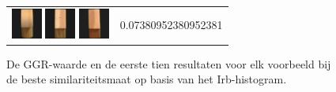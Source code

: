 \begin{figure}[tbp]
\begin{center}
\begin{tabular}{m{11cm} | m{3cm} |}
\includegraphics[width=1cm]{coil/beeld-2.eps} 
\includegraphics[width=1cm]{coil/beeld-47.eps} 
\includegraphics[width=1cm]{coil/beeld-44.eps} & {\scriptsize 
0.07380952380952381}
\end{tabular}
\caption{\label{fig:results_irb_histgeb}De GGR-waarde en de eerste tien resultaten voor elk voorbeeld bij de beste similariteitsmaat op basis van het Irb-histogram.}
\end{center}
\end{figure}

